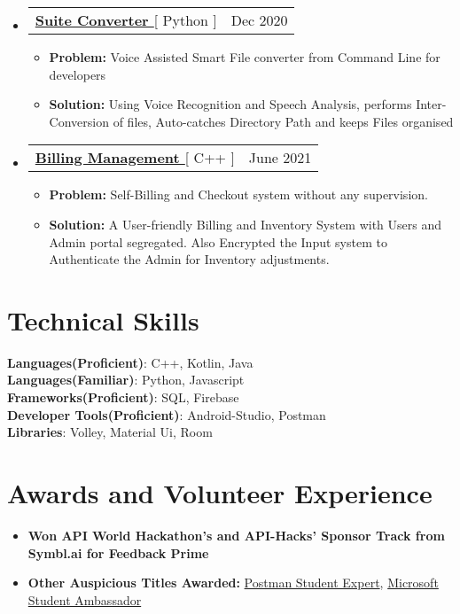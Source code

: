 \documentclass[letterpaper,11pt]{article}
\makeatletter
\newcommand{\resumeItem}[1]{
  \item\small{
    {#1 \vspace{-2pt}}
  }
}
\newcommand{\resumeProjectHeading}[2]{
    \item
    \begin{tabular*}{0.97\textwidth}{l@{\extracolsep{\fill}}r}
      \small#1 & #2 \\
    \end{tabular*}\vspace{-7pt}
}
\newcommand{\resumeSubHeadingListStart}{\begin{itemize}[leftmargin=0.15in, label={}]}
\newcommand{\resumeSubHeadingListEnd}{\end{itemize}}
\newcommand{\resumeItemListStart}{\begin{itemize}}
\newcommand{\resumeItemListEnd}{\end{itemize}\vspace{-5pt}}
\makeatother
\begin{document}
\resumeSubHeadingListStart
      \resumeProjectHeading
          {\textbf{\href{https://github.com/aniketk13/Suite-Converter}{\color{blue}Suite Converter }}{[ Python ]}}{Dec 2020}
          \resumeItemListStart
           \resumeItem{\textbf{Problem:} Voice Assisted Smart File converter from Command Line for developers}
           \resumeItem{\textbf{Solution:} Using Voice Recognition and Speech Analysis, performs Inter-Conversion of files, Auto-catches Directory Path and keeps Files organised}
          \resumeItemListEnd
    \resumeSubHeadingListEnd
\resumeSubHeadingListStart
      \resumeProjectHeading
          {\textbf{\href{https://github.com/aniketk13/Billing_Management}{\color{blue}Billing Management }}{[ C++ ]}}{June 2021}
          \resumeItemListStart
          \resumeItem{\textbf{Problem:} Self-Billing and Checkout system without any supervision.}
          \resumeItem{\textbf{Solution:} A User-friendly Billing and Inventory System with Users and Admin portal segregated. Also Encrypted the Input system to Authenticate the Admin for Inventory adjustments.}
          \resumeItemListEnd
    \resumeSubHeadingListEnd


%
\section{Technical Skills}
 \begin{itemize}[leftmargin=0.15in, label={}]
    \small{\item{
     \textbf{Languages(Proficient)}{: C++, Kotlin, Java} \\
      \textbf{Languages(Familiar)}{: Python, Javascript } \\
     \textbf{Frameworks(Proficient)}{: SQL, Firebase  } \\
     \textbf{Developer Tools(Proficient)}{: Android-Studio, Postman } \\
     \textbf{Libraries}{: Volley, Material Ui, Room  }
    }}
 \end{itemize}

\section{Awards and Volunteer Experience }
 \begin{itemize}[leftmargin=0.15in, label={}]
    \small{\item{
        \resumeItemListStart
                \resumeItem{\textbf{{Won API World Hackathon's and API-Hacks' Sponsor Track from Symbl.ai for Feedback Prime} }}
                \resumeItem{\textbf{Other Auspicious Titles Awarded: }\href{https://api.badgr.io/public/assertions/smxpDApNQkawRdyLq88rTA}{ \color{blue}Postman Student Expert}, \href{https://studentambassadors.microsoft.com/en-US/profile/124303}{\color{blue}Microsoft Student Ambassador}}
      \resumeItemListEnd
    }}
 \end{itemize}
 
\end{document}
